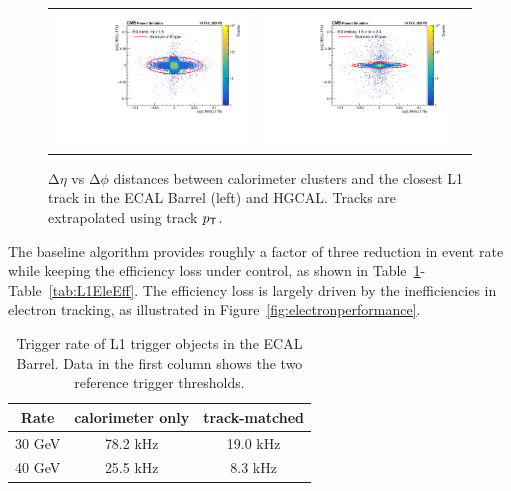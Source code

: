 \begin{figure}[tbh!]
 \begin{center}
 \begin{tabular}{ccc}
  \includegraphics[width=.45\linewidth]{figures/Part2/Upgrade/DR_barrel}&
  \includegraphics[width=.45\linewidth]{figures/Part2/Upgrade/DR_endcap}&
 \end{tabular}
 \caption{$\mathrm{\Delta}\eta$ vs $\mathrm{\Delta}\phi$ distances between calorimeter clusters and the closest \ac{L1} track in the \ac{ECAL} Barrel (left) and \ac{HGCAL}. Tracks are extrapolated using track $p_{\textsf{T}}$.}
 \label{fig:electron}
 \end{center}
\end{figure}

The baseline algorithm provides roughly a factor of three reduction in event rate while keeping the efficiency loss under control, as shown in Table~\ref{tab:L1EleRate}-Table~\ref{tab:L1EleEff}. The efficiency loss is largely driven by the inefficiencies in electron tracking, as illustrated in Figure~\ref{fig:electronperformance}.

\begin{table}[th]
\sffamily
\centering
\caption{Trigger rate of \ac{L1} trigger objects in the \ac{ECAL} Barrel. Data in the first column shows the two reference trigger thresholds.}
\begin{tabular}{ccc} \toprule
Rate & calorimeter only & track-matched \\  \midrule
 30 GeV   & 78.2 kHz   & 19.0 kHz\\ \midrule
 40 GeV & 25.5 kHz   & 8.3 kHz\\ \bottomrule
\end{tabular}
\label{tab:L1EleRate}
\end{table}

